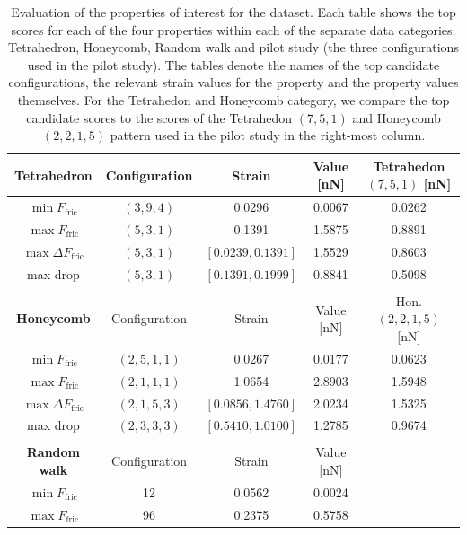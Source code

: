 \begin{table}[!htb]
  \begin{center}
  \caption{Evaluation of the properties of interest for the dataset. Each table shows the top scores for each of the four properties within each of the separate data categories: Tetrahedron, Honeycomb, Random walk and pilot study (the three configurations used in the pilot study). The tables denote the names of the top candidate configurations, the relevant strain values for the property and the property values themselves. For the Tetrahedon and Honeycomb category, we compare the top candidate scores to the scores of the Tetrahedon $(7,5,1)$ and Honeycomb $(2,2,1,5)$ pattern used in the pilot study in the right-most column. }
  \label{tab:data_properties}
  \begin{tabular}{| c | c | c | c | c |} \hline
  \textbf{Tetrahedron} & Configuration & Strain & Value [nN] & Tetrahedon $(7,5,1)$ [nN]  \\ \hline
  $\min F_{\text{fric}}$ & $(3,9,4)$ &  0.0296 & 0.0067 & 0.0262 \\ \hline
  $\max F_{\text{fric}}$ & $(5,3,1)$ & 0.1391 & 1.5875 & 0.8891 \\ \hline
  $\max \Delta F_{\text{fric}}$  & $(5, 3, 1)$ & $[0.0239, 0.1391]$ & 1.5529 & 0.8603  \\ \hline
  max drop & $(5,3,1)$ & $[0.1391, 0.1999]$ & 0.8841 & 0.5098 \\ \hline
  \multicolumn{5}{c}{} \\ \hline
  \textbf{Honeycomb} & Configuration & Strain & Value [nN]  & Hon. $(2,2,1,5)$ [nN]  \\ \hline
  $\min F_{\text{fric}}$ & $(2, 5, 1, 1)$ &  0.0267 & 0.0177 & 0.0623 \\ \hline
  $\max F_{\text{fric}}$ & $(2, 1, 1, 1)$ & 1.0654 & 2.8903 & 1.5948 \\ \hline
  $\max \Delta F_{\text{fric}}$  & $(2, 1, 5, 3)$ & $[0.0856, 1.4760]$ & 2.0234 & 1.5325 \\ \hline
  max drop & $(2, 3, 3, 3)$ & $[0.5410, 1.0100]$ & 1.2785 & 0.9674\\ \hline
  \multicolumn{5}{c}{} \\ \cline{1-4}
  \textbf{Random walk} & Configuration & Strain & Value [nN] & \multicolumn{1}{c}{} \\ \cline{1-4}
  $\min F_{\text{fric}}$ & 12 &  0.0562 & 0.0024& \multicolumn{1}{c}{} \\ \cline{1-4}
  $\max F_{\text{fric}}$ & 96 & 0.2375 & 0.5758 & \multicolumn{1}{c}{} \\ \cline{1-4}

\end{tabular}
\end{center}
\end{table}
